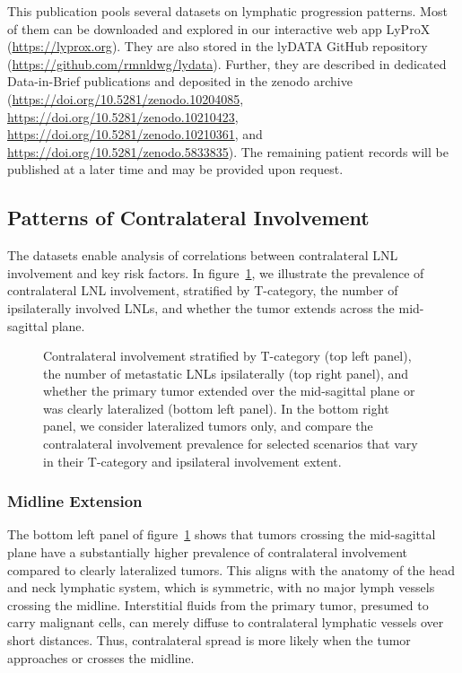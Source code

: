 \documentclass[
  sn-mathphys-num,
]{sn-jnl}
\makeatletter
\newcommand*\pandocbounded[1]{%
  \sbox\pandoc@box{#1}%
  \Gscale@div\@tempa{\textheight}{\dimexpr\ht\pandoc@box+\dp\pandoc@box\relax}%
  \Gscale@div\@tempb{\linewidth}{\wd\pandoc@box}%
  \ifdim\@tempb\p@<\@tempa\p@\let\@tempa\@tempb\fi%
  \ifdim\@tempa\p@<\p@\scalebox{\@tempa}{\usebox\pandoc@box}%
  \else\usebox{\pandoc@box}%
  \fi%
}
\makeatother
\begin{document}
This publication pools several datasets on lymphatic progression patterns. Most of them can be downloaded and explored in our interactive web app LyProX (\url{https://lyprox.org}). They are also stored in the lyDATA GitHub repository (\url{https://github.com/rmnldwg/lydata}). Further, they are described in dedicated Data-in-Brief publications \citep{ludwig_dataset_2022,ludwig_multicentric_2024} and deposited in the zenodo archive (\url{https://doi.org/10.5281/zenodo.10204085}, \url{https://doi.org/10.5281/zenodo.10210423}, \url{https://doi.org/10.5281/zenodo.10210361}, and \url{https://doi.org/10.5281/zenodo.5833835}). The remaining patient records will be published at a later time and may be provided upon request.

\subsection{Patterns of Contralateral Involvement}\label{sec-data-strat}

The datasets enable analysis of correlations between contralateral LNL
involvement and key risk factors. In figure~\ref{fig-data-strat}, we
illustrate the prevalence of contralateral LNL involvement, stratified
by T-category, the number of ipsilaterally involved LNLs, and whether
the tumor extends across the mid-sagittal plane.

\begin{figure}

\centering{

\pandocbounded{}

}

\caption{\label{fig-data-strat}Contralateral involvement stratified by
T-category (top left panel), the number of metastatic LNLs ipsilaterally
(top right panel), and whether the primary tumor extended over the
mid-sagittal plane or was clearly lateralized (bottom left panel). In
the bottom right panel, we consider lateralized tumors only, and compare
the contralateral involvement prevalence for selected scenarios that
vary in their T-category and ipsilateral involvement extent.}

\end{figure}%

\subsubsection{Midline Extension}\label{midline-extension}

The bottom left panel of figure~\ref{fig-data-strat} shows that tumors
crossing the mid-sagittal plane have a substantially higher prevalence
of contralateral involvement compared to clearly lateralized tumors.
This aligns with the anatomy of the head and neck lymphatic system,
which is symmetric, with no major lymph vessels crossing the midline.
Interstitial fluids from the primary tumor, presumed to carry malignant
cells, can merely diffuse to contralateral lymphatic vessels over short
distances. Thus, contralateral spread is more likely when the tumor
approaches or crosses the midline.
\end{document}

